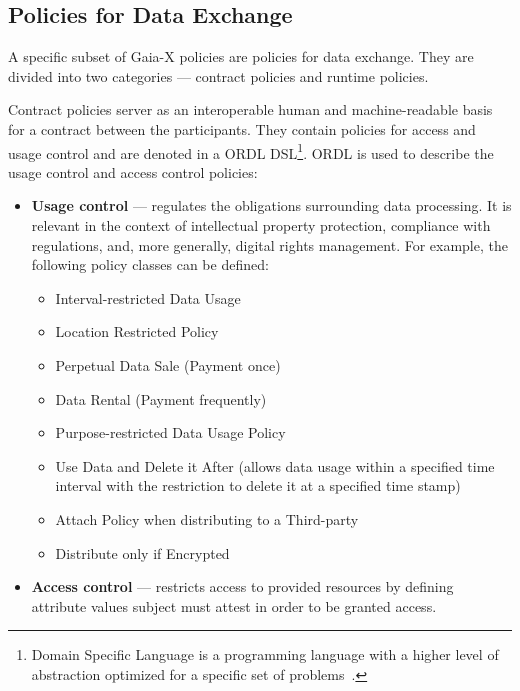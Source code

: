 \subsection{Policies for Data Exchange}\label{subsec:policies-for-data-exchange}

A specific subset of Gaia-X policies are policies for data exchange\cite{gaiax_data_exchange_document}.
They are divided into two categories --- contract policies and runtime policies.

Contract policies server as an interoperable human and machine-readable basis for a contract between the participants.
They contain policies for access and usage control and are denoted in a ORDL DSL\footnote{Domain Specific Language is a programming language with a higher level of abstraction optimized for a specific set of problems~\cite{domain_specific_languages}.}.
ORDL is used to describe the usage control and access control policies:
\begin{itemize}
    \item \textbf{Usage control} --- regulates the obligations surrounding data processing.
    It is relevant in the context of intellectual property protection, compliance with regulations, and, more generally, digital rights management.
    For example, the following policy classes can be defined:
    \begin{itemize}
        \item Interval-restricted Data Usage
        \item Location Restricted Policy
        \item Perpetual Data Sale (Payment once)
        \item Data Rental (Payment frequently)
        \item Purpose-restricted Data Usage Policy
        \item Use Data and Delete it After (allows data usage within a specified time interval with the restriction to delete it at a specified time stamp)
        \item Attach Policy when distributing to a Third-party
        \item Distribute only if Encrypted
    \end{itemize}
    \item \textbf{Access control} --- restricts access to provided resources by defining attribute values subject must attest in order to be granted access.
\end{itemize}

